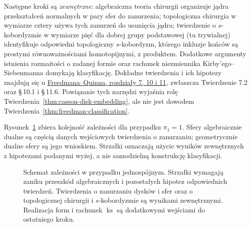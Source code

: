 Następne kroki są \emph{zewnętrzne}: algebraiczna
teoria chirurgii organizuje jądra przekształceń
normalnych w pary sfer do zanurzenia; topologiczna
chirurgia w wymiarze cztery używa tych zanurzeń
do usunięcia jądra; twierdzenie o $s$-kobordyzmie
w wymiarze pięć dla dobrej grupy podstawowej
(tu trywialnej) identyfikuje odpowiedni topologiczny
$s$-kobordyzm, którego inkluzje końców są prostymi
równoważnościami homotopijnymi, z produktem.
Dodatkowe argumenty istnienia rozmaitości
o zadanej formie oraz rachunek niezmiennika
Kirby'ego--Siebenmanna domykają klasyfikację.
Dokładne twierdzenia i ich hipotezy znajdują się
u \href{https://archive.mpim-bonn.mpg.de/4789/2/FreedmanQuinn-TopologyOf4Manifolds-Reformatted2013.pdf}
{Freedmana--Quinna, rozdziały 7, 10 i 11},
zwłaszcza Twierdzenie 7.2 oraz \S\,10.1 i \S\,11.6.
Powiązanie tych narzędzi wyjaśnia rolę
Twierdzenia~\ref{thm:casson-disk-embedding},
ale nie jest dowodem
Twierdzenia~\ref{thm:freedman-classification}.

Rysunek~\ref{fig:freedman-classification-route} zbiera
kolejność zależności dla przypadku $\pi_1=1$.
Sfery algebraicznie dualne są częścią danych wejściowych
twierdzenia o zanurzaniu; geometrycznie dualne sfery
są jego wnioskiem. Strzałki oznaczają użycie wyników
zewnętrznych z hipotezami podanymi wyżej, a nie
samodzielną konstrukcję klasyfikacji.

\begin{figure}[htbp]
\centering
{}
\caption{Schemat zależności w przypadku jednospójnym.
Strzałki wymagają zaniku przeszkód algebraicznych i pozostałych
hipotez odpowiednich twierdzeń. Twierdzenia o zanurzaniu
dysków i sfer oraz o topologicznej
chirurgii i $s$-kobordyzmie są wynikami zewnętrznymi.
Realizacja form i rachunek $\operatorname{ks}$ są dodatkowymi
wejściami do ostatniego kroku.}
\label{fig:freedman-classification-route}
\end{figure}

